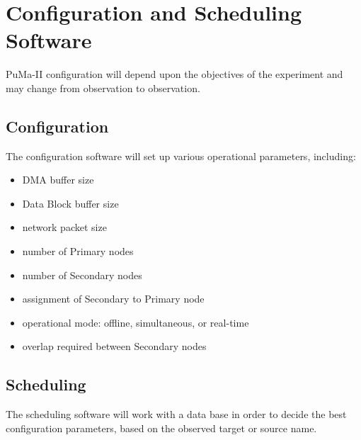 \chapter{Configuration and Scheduling Software}

PuMa-II configuration will depend upon the objectives of the
experiment and may change from observation to observation.

\section{Configuration}

The configuration software will set up various operational parameters,
including:

\begin{itemize}
\item DMA buffer size
\item Data Block buffer size
\item network packet size
\item number of Primary nodes
\item number of Secondary nodes
\item assignment of Secondary to Primary node
\item operational mode: offline, simultaneous, or real-time
\item overlap required between Secondary nodes
\end{itemize}

\section{Scheduling}

The scheduling software will work with a data base in order to decide
the best configuration parameters, based on the observed target or
source name.
